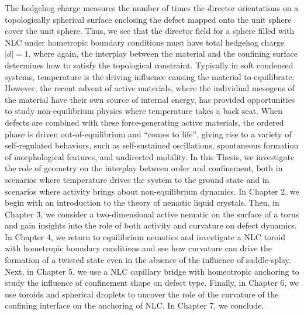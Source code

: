 The hedgehog charge measures the number of times the director orientations on a topologically spherical surface enclosing the defect mapped onto the unit sphere cover the unit sphere.
Thus, we see that the director field for a sphere filled with NLC under hometropic boundary conditions must have total hedgehog charge $|d| = 1$, where again, the interplay between the material and the confining surface determines how to satisfy the topological constraint.
Typically in soft condensed systems, temperature is the driving influence causing the material to equilibrate.
However, the recent advent of active materials, where the individual mesogens of the material have their own source of internal energy, has provided opportunities to study non-equilibrium physics where temperature takes a back seat.
When defects are combined with these force-generating active materials, the ordered phase is driven out-of-equilibrium and ``comes to life'', giving rise to a variety of self-regulated behaviors, such as self-sustained oscillations, spontaneous formation of morphological features, and undirected mobility.
In this Thesis, we investigate the role of geometry on the interplay between order and confinement, both in scenarios where temperature drives the system to the ground state and in scenarios where activity brings about non-equilibrium dynamics.
In Chapter 2, we begin with an introduction to the theory of nematic liquid crystals.
Then, in Chapter 3, we consider a two-dimensional active nematic on the surface of a torus and gain insights into the role of both activity and curvature on defect dynamics.
In Chapter 4, we return to equilibrium nematics and investigate a NLC toroid with hometropic boundary conditions and see how curvature can drive the formation of a twisted state even in the absence of the influence of saddle-splay.
Next, in Chapter 5, we use a NLC capillary bridge with homeotropic anchoring to study the influence of confinement shape on defect type.
Finally, in Chapter 6, we use toroids and spherical droplets to uncover the role of the curvature of the confining interface on the anchoring of NLC.
In Chapter 7, we conclude.
